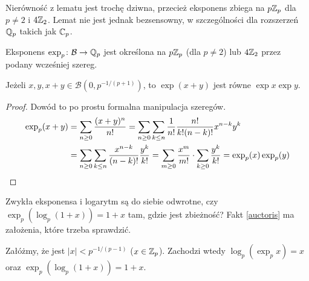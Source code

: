 Nierówność z lematu jest trochę dziwna, przecież eksponens zbiega na $p \mathbb Z_p$ dla $p \neq 2$ i $4\mathbb Z_2$.
Lemat nie jest jednak bezsensowny, w szczególności dla rozszerzeń $\mathbb Q_p$ takich jak $\mathbb C_p$.

\begin{definicja}
	Eksponens $\exp_p \colon \mathcal B \to \mathbb Q_p$ jest określona na $p\mathbb Z_p$ (dla $p \neq 2$) lub $4\mathbb Z_2$ przez podany wcześniej szereg.
\end{definicja}

\begin{fakt}
	Jeżeli $x, y, x+y \in \mathcal B(0, p^{-1/(p+1)})$, to $\exp(x+y)$ jest równe $\exp x \exp y$.
\end{fakt}

\begin{proof}
	Dowód to po prostu formalna manipulacja szeregów.
	\begin{align*}
		\exp_p(x+y) & = \sum_{n \ge 0} \frac{(x+y)^n}{n!} 
		 = \sum_{n \ge 0} \sum_{k \le n} \frac{1}{n!} \frac{n!}{k!(n-k)!} x^{n-k}y^k \\
		& = \sum_{n \ge 0} \sum_{k \le n} \frac{x^{n-k}}{(n-k)!} \frac{y^k}{k!} = \sum_{m \ge 0} \frac{x^m}{m!} \cdot \sum_{k \ge 0} \frac{y^k}{k!} = \exp_p(x) \exp_p(y) \qedhere
	\end{align*}
\end{proof}

Zwykła eksponensa i logarytm są do siebie odwrotne, czy $\exp_p(\log_p(1+x)) = 1+x$ tam, gdzie jest zbieżność?
Fakt \ref{auctoris} ma założenia, które trzeba sprawdzić.

\begin{fakt}
	Załóżmy, że jest $|x| < p^{-1/(p-1)}$ ($x \in \mathbb Z_p$). Zachodzi wtedy $\log_p (\exp_p x) = x$ oraz $\exp_p(\log_p (1+x)) = 1 + x$.
\end{fakt}

